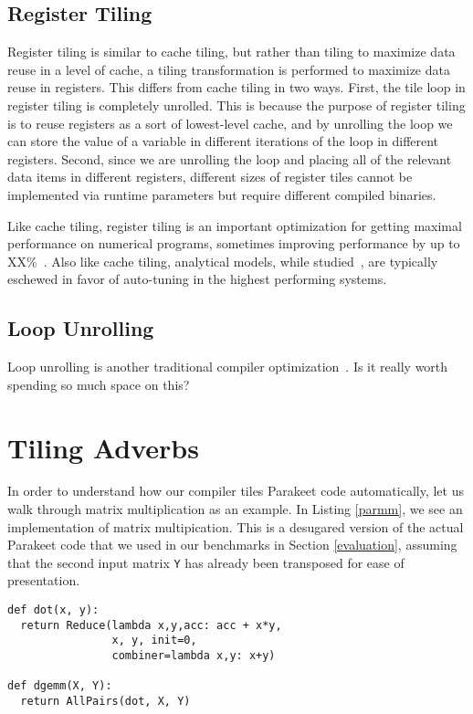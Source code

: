 \documentclass[preprint,9pt]{sigplanconf}
\begin{document}
\subsection{Register Tiling}
\label{register_tiling}

Register tiling is similar to cache tiling, but rather than tiling to maximize data reuse in a level of cache, a tiling transformation is performed to maximize data reuse in registers.  This differs from cache tiling in two ways.  First, the tile loop in register tiling is completely unrolled.  This is because the purpose of register tiling is to reuse registers as a sort of lowest-level cache, and by unrolling the loop we can store the value of a variable in different iterations of the loop in different registers.  Second, since we are unrolling the loop and placing all of the relevant data items in different registers, different sizes of register tiles cannot be implemented via runtime parameters but require different compiled binaries.

Like cache tiling, register tiling is an important optimization for getting maximal performance on numerical programs, sometimes improving performance by up to XX\%~\cite{Whal00}.  Also like cache tiling, analytical models, while studied~\cite{Yoto03, Yoto05}, are typically eschewed in favor of auto-tuning in the highest performing systems.

\subsection{Loop Unrolling}
\label{unrolling}

Loop unrolling is another traditional compiler optimization~\cite{}.  Is it really worth spending so much space on this?

\section{Tiling Adverbs}
\label{tiling_transform}

In order to understand how our compiler tiles Parakeet code automatically, let us walk through matrix multiplication as an example.  In Listing \ref{parmm}, we see an implementation of matrix multipication.  This is a desugared version of the actual Parakeet code that we used in our benchmarks in Section \ref{evaluation}, assuming that the second input matrix \lstinline{Y} has already been transposed for ease of presentation.

\begin{lstlisting}[label=parmm, caption={Parakeet Matrix Multiply}, belowskip=0.5em]
def dot(x, y):
  return Reduce(lambda x,y,acc: acc + x*y,
                x, y, init=0,
                combiner=lambda x,y: x+y)

def dgemm(X, Y):
  return AllPairs(dot, X, Y)
\end{lstlisting}
\end{document}
